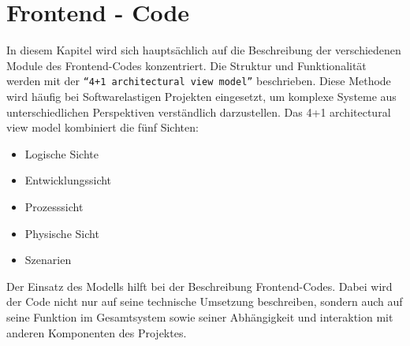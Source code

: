 \section{Frontend - Code}
\label{subsec:frontend_Code}
In diesem Kapitel wird sich hauptsächlich auf die Beschreibung der verschiedenen Module des
Frontend-Codes konzentriert. Die Struktur und Funktionalität werden mit der \texttt{``4+1 architectural view model''} beschrieben.
%
Diese Methode wird häufig bei Softwarelastigen Projekten eingesetzt, um komplexe Systeme aus unterschiedlichen
Perspektiven verständlich darzustellen.
Das 4+1 architectural view model kombiniert die fünf Sichten:
\begin{itemize}
  \item Logische Sichte
  \item Entwicklungssicht
  \item Prozesssicht
  \item Physische Sicht
  \item Szenarien
\end{itemize} 
Der Einsatz des Modells hilft bei der Beschreibung Frontend-Codes. 
Dabei wird der Code nicht nur auf seine technische Umsetzung beschreiben,
sondern auch auf seine Funktion im Gesamtsystem 
sowie seiner Abhängigkeit und interaktion mit anderen Komponenten des Projektes.

